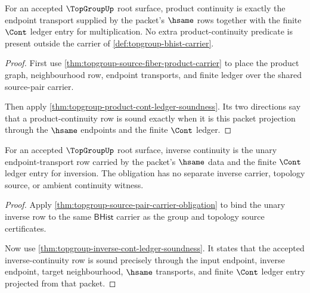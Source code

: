 \begin{theorem}
\label{thm:topgroup-product-continuity-obligation}
For an accepted $\TopGroupUp$ root surface, product continuity is exactly the
endpoint transport supplied by the packet's $\hsame$ rows together with the
finite $\Cont$ ledger entry for multiplication. No extra product-continuity
predicate is present outside the carrier of \autoref{def:topgroup-bhist-carrier}.
\end{theorem}
\begin{proof}
First use \autoref{thm:topgroup-source-fiber-product-carrier} to place the
product graph, neighbourhood row, endpoint transports, and finite ledger over
the shared source-pair carrier.

Then apply \autoref{thm:topgroup-product-cont-ledger-soundness}. Its two
directions say that a product-continuity row is sound exactly when it is this
packet projection through the $\hsame$ endpoints and the finite $\Cont$ ledger.
\end{proof}

\begin{theorem}
\label{thm:topgroup-inverse-continuity-obligation}
For an accepted $\TopGroupUp$ root surface, inverse continuity is the unary
endpoint-transport row carried by the packet's $\hsame$ data and the finite
$\Cont$ ledger entry for inversion. The obligation has no separate inverse
carrier, topology source, or ambient continuity witness.
\end{theorem}
\begin{proof}
Apply \autoref{thm:topgroup-source-pair-carrier-obligation} to bind the unary
inverse row to the same $\mathsf{BHist}$ carrier as the group and topology source
certificates.

Now use \autoref{thm:topgroup-inverse-cont-ledger-soundness}. It states that the
accepted inverse-continuity row is sound precisely through the input endpoint,
inverse endpoint, target neighbourhood, $\hsame$ transports, and finite
$\Cont$ ledger entry projected from that packet.
\end{proof}

